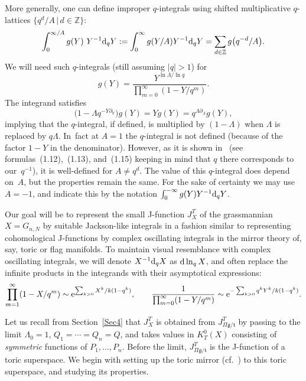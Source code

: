 \documentclass[10pt,a4paper]{amsart}
\numberwithin{equation}{section}
\def\ZZ{\mathbb Z}
\def\p{\partial}
\theoremstyle{definition}
\theoremstyle{plain}
\begin{document}
More generally, one can define improper $q$-integrals using shifted multiplicative
$q$-lattices $\big\{ q^d/A\, |\, d\in\ZZ\big\}$:
\[
\int_0^{\infty/A} g(Y)\ Y^{-1}{\rm d}_qY:=\int_0^{\infty}g(Y/A) Y^{-1}{\rm d}_q Y=\sum_{d\in\ZZ}g\big(q^{-d}/A\big).
\]
We will need such $q$-integrals (still assuming $|q|>1$) for
\[
g(Y)=\frac{Y^{\ln \Lambda/\ln q}}{\prod_{m=0}^{\infty}(1-Y/q^m)}.
\]
The integrand satisfies
\[
\big(1-\Lambda q^{-Y\p_Y}\big) g(Y) = Y g(Y) = q^{\Lambda\p_{\Lambda}} g(Y),
\]
implying that the $q$-integral, if defined, is multiplied by $(1-\Lambda)$ when $\Lambda$
is replaced by $q\Lambda$. In~fact at $A=1$ the $q$-integral is not defined (because of the factor $1-Y$ in the denominator). However, as it is shown in~\cite{DK}
(see formulas~(1.12),~(1.13), and~(1.15) keeping in mind that $q$ there corresponds to
our~$q^{-1}$), it is well-defined for $A\neq q^d$.
The value of this $q$-integral does depend on~$A$, but the properties remain the same.
For the sake of certainty we may use $A=-1$, and indicate this by the notation
$\int_0^{-\infty} g(Y) Y^{-1}{\rm d}_qY$.

Our goal will be to represent the small J-function $J_X^T$ of the grassmannian $X=G_{n,N}$ by suitable Jackson-like integrals in a fashion similar to representing cohomological J-functions by complex oscillating integrals in the mirror theory of, say, toric or flag manifolds. To maintain visual resemblance with complex oscillating integrals, we will denote $X^{-1}{\rm d}_q X$ as ${\rm d}\ln_q X$, and often replace the infinite products in the integrands
with their asymptotical expressions:
\begin{gather*}
\prod_{m=1}^{\infty}(1-X/q^m) \sim {\rm e}^{ \sum_{k>0}X^k/k(1-q^k)},
\qquad
\frac{1}{\prod_{m=0}^{\infty}(1-Y/q^m)} \sim {\rm e}^{ -\sum_{k>0}q^kY^k/k(1-q^k)}.
\end{gather*}

Let us recall from Section~\ref{Sec4} that $J^T_X$ is obtained from $J^T_{\Pi\mathfrak{g}/\mathfrak{t}}$ by passing to the limit $\Lambda_0=1$, $Q_1=\cdots=Q_n=Q$, and takes values in $K^0_T(X)$ consisting of {\em symmetric} functions of $P_1,\dots,P_n$. Before the limit, $J^T_{\Pi\mathfrak{g}/\mathfrak{t}}$ is the J-function of a toric superspace. We begin with setting up the toric mirror (cf.~\cite{Givental:perm6}) to this toric superspace, and studying its properties.
\end{document}
